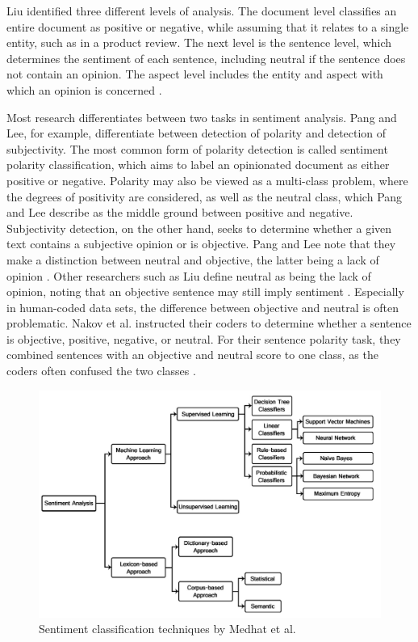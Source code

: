 Liu identified three different levels of analysis. The document level classifies an entire document as positive or negative, while assuming that it relates to a single entity, such as in a product review. The next level is the sentence level, which determines the sentiment of each sentence, including neutral if the sentence does not contain an opinion. The aspect level includes the entity and aspect with which an opinion is concerned \cite{liu_2015}.

Most research differentiates between two tasks in sentiment analysis. Pang and Lee, for example, differentiate between detection of polarity and detection of subjectivity. The most common form of polarity detection is called sentiment polarity classification, which aims to label an opinionated document as either positive or negative. Polarity may also be viewed as a multi-class problem, where the degrees of positivity are considered, as well as the neutral class, which Pang and Lee describe as the middle ground between positive and negative. Subjectivity detection, on the other hand, seeks to determine whether a given text contains a subjective opinion or is objective. Pang and Lee note that they make a distinction between neutral and objective, the latter being a lack of opinion \cite{DBLP:journals/ftir/PangL07}. Other researchers such as Liu define neutral as being the lack of opinion, noting that an objective sentence may still imply sentiment \cite{liu_2015}. Especially in human-coded data sets, the difference between objective and neutral is often problematic. Nakov et al. instructed their coders to determine whether a sentence is objective, positive, negative, or neutral. For their sentence polarity task, they combined sentences with an objective and neutral score to one class, as the coders often confused the two classes \cite{nakov-etal-2013-semeval}.

\begin{figure}
    \centering
    \includegraphics[scale=0.3]{Images/classification_techniques.png}
    \caption{Sentiment classification techniques by Medhat et al. \cite{MEDHAT20141093}}
    \label{fig:classifiers}
\end{figure}


